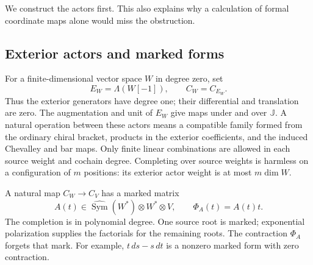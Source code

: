We construct the actors first. This also explains why a
calculation of formal coordinate maps alone would miss the
obstruction.

\subsection{Exterior actors and marked forms}

For a finite-dimensional vector space $W$ in degree zero, set
\[
 E_W=\Lambda(W[-1]),\qquad C_W=C_{E_W}.
\]
Thus the exterior generators have degree one; their
differential and translation are zero. The augmentation and
unit of $E_W$ give maps under and over $\mathbb J$.
A natural operation between these actors means a compatible
family formed from the ordinary chiral bracket, products in
the exterior coefficients, and the induced Chevalley and bar
maps. Only finite linear combinations are allowed in each
source weight and cochain degree. Completing over source
weights is harmless on a configuration of $m$ positions:
its exterior actor weight is at most $m\dim W$.

A natural map $C_W\to C_V$ has a marked matrix
\[
 A(t)\in\widehat{\operatorname{Sym}}(W^*)\otimes W^*\otimes V,
 \qquad \Phi_A(t)=A(t)t.
\]
The completion is in polynomial degree. One source root is
marked; exponential polarization supplies the factorials for
the remaining roots. The contraction $\Phi_A$ forgets that
mark. For example, $t\,ds-s\,dt$ is a nonzero marked form
with zero contraction.

